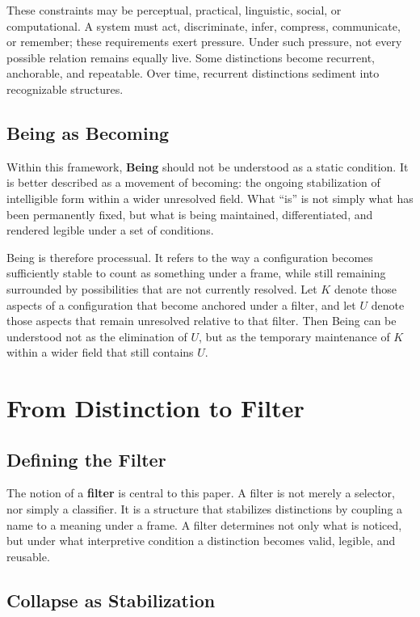 \documentclass[11pt,a4paper]{article}
\newcommand{\term}[1]{\textbf{#1}}
\begin{document}
These constraints may be perceptual, practical, linguistic, social, or computational. A system must act, discriminate, infer, compress, communicate, or remember; these requirements exert pressure. Under such pressure, not every possible relation remains equally live. Some distinctions become recurrent, anchorable, and repeatable. Over time, recurrent distinctions sediment into recognizable structures.

\subsection{Being as Becoming}

Within this framework, \term{Being} should not be understood as a static condition. It is better described as a movement of becoming: the ongoing stabilization of intelligible form within a wider unresolved field. What ``is'' is not simply what has been permanently fixed, but what is being maintained, differentiated, and rendered legible under a set of conditions.

Being is therefore processual. It refers to the way a configuration becomes sufficiently stable to count as something under a frame, while still remaining surrounded by possibilities that are not currently resolved. Let $K$ denote those aspects of a configuration that become anchored under a filter, and let $U$ denote those aspects that remain unresolved relative to that filter. Then Being can be understood not as the elimination of $U$, but as the temporary maintenance of $K$ within a wider field that still contains $U$.

\section{From Distinction to Filter}

\subsection{Defining the Filter}

The notion of a \term{filter} is central to this paper. A filter is not merely a selector, nor simply a classifier. It is a structure that stabilizes distinctions by coupling a name to a meaning under a frame. A filter determines not only what is noticed, but under what interpretive condition a distinction becomes valid, legible, and reusable.

\subsection{Collapse as Stabilization}
\end{document}
